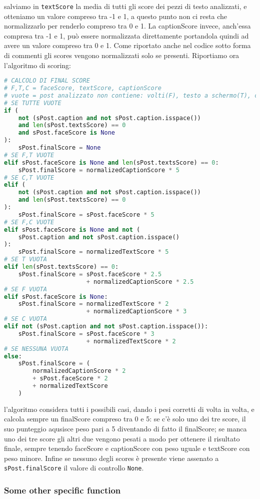salviamo in \verb+textScore+ la media di tutti gli score dei pezzi di testo analizzati, e otteniamo
un valore compreso tra -1 e 1, a questo punto non ci resta che normalizzarlo per renderlo compreso
tra 0 e 1. 
La captionScore invece, anch'essa compresa tra -1 e 1, può essere normalizzata direttamente portandola
quindi ad avere un valore compreso tra 0 e 1.
Come riportato anche nel codice sotto forma di commenti gli scores vengono normalizzati solo se presenti.
Riportiamo ora l'algoritmo di scoring:
\begin{lstlisting}[language=Python]
# CALCOLO DI FINAL SCORE
# F,T,C = faceScore, textScore, captionScore
# vuote = post analizzato non contiene: volti(F), testo a schermo(T), caption(C)
# SE TUTTE VUOTE
if (
    not (sPost.caption and not sPost.caption.isspace())
    and len(sPost.textsScore) == 0
    and sPost.faceScore is None
):
    sPost.finalScore = None
# SE F,T VUOTE
elif sPost.faceScore is None and len(sPost.textsScore) == 0:
    sPost.finalScore = normalizedCaptionScore * 5
# SE C,T VUOTE
elif (
    not (sPost.caption and not sPost.caption.isspace())
    and len(sPost.textsScore) == 0
):
    sPost.finalScore = sPost.faceScore * 5
# SE F,C VUOTE
elif sPost.faceScore is None and not (
    sPost.caption and not sPost.caption.isspace()
):
    sPost.finalScore = normalizedTextScore * 5
# SE T VUOTA
elif len(sPost.textsScore) == 0:
    sPost.finalScore = sPost.faceScore * 2.5 
                       + normalizedCaptionScore * 2.5
# SE F VUOTA
elif sPost.faceScore is None:
    sPost.finalScore = normalizedTextScore * 2 
                       + normalizedCaptionScore * 3
# SE C VUOTA
elif not (sPost.caption and not sPost.caption.isspace()):
    sPost.finalScore = sPost.faceScore * 3 
                       + normalizedTextScore * 2
# SE NESSUNA VUOTA
else:
    sPost.finalScore = (
        normalizedCaptionScore * 2 
        + sPost.faceScore * 2 
        + normalizedTextScore
    )
\end{lstlisting}
l'algoritmo considera tutti i possibili casi, dando i pesi corretti di volta in volta, e calcola
sempre un finalScore compreso tra 0 e 5: se c'è solo uno dei tre score, il suo punteggio aqusisce
peso pari a 5 diventando di fatto il finalScore; se manca uno dei tre score gli altri due vengono
pesati a modo per ottenere il risultato finale, sempre tenendo faceScore e captionScore con peso
uguale e textScore con peso minore.
Infine se nessuno degli scores è presente viene assenato a \verb+sPost.finalScore+ il valore di
controllo \verb+None+.



\subsubsection{Some other specific function}
